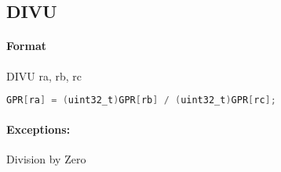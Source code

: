 \subsection{DIVU}


\paragraph{Format} DIVU ra, rb, rc

\begin{lstlisting}[language=C]
    GPR[ra] = (uint32_t)GPR[rb] / (uint32_t)GPR[rc];
\end{lstlisting}

\paragraph{Exceptions:} Division by Zero
